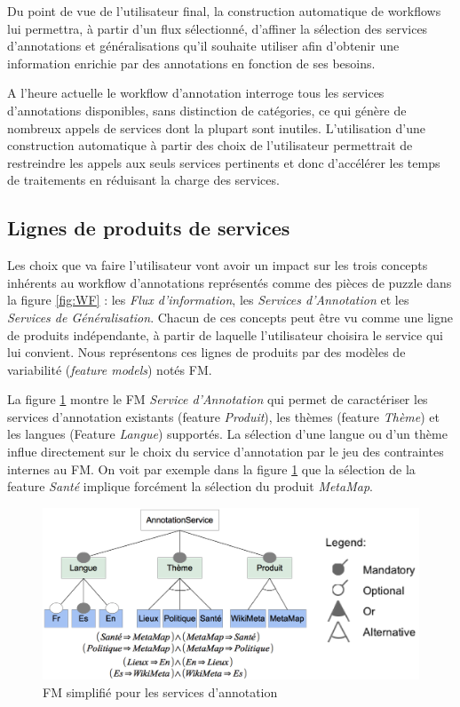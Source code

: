 \documentclass[]{easychair}
\begin{document}
Du point de vue de l'utilisateur final, la construction automatique de workflows lui permettra, à partir d'un flux sélectionné, d'affiner la sélection des services d'annotations et généralisations qu'il souhaite utiliser afin d'obtenir une information enrichie par des annotations en fonction de ses besoins. 

A l'heure actuelle le workflow d'annotation interroge tous les services d'annotations disponibles, sans distinction de catégories, ce qui génère de nombreux appels de services dont la plupart sont inutiles. L'utilisation d'une construction automatique à partir des choix de l'utilisateur permettrait de restreindre les appels aux seuls services pertinents et donc d'accélérer les temps de traitements en réduisant la charge des services. 


\subsection{Lignes de produits de services}
Les choix que va faire l'utilisateur vont avoir un impact sur les trois concepts inhérents au workflow d'annotations représentés comme des pièces de puzzle dans la figure \ref{fig:WF} : les \textit{Flux d'information}, les \textit{Services d'Annotation} et les \textit{Services de Généralisation}. Chacun de ces concepts peut être vu comme une ligne de produits indépendante, à partir de laquelle l'utilisateur choisira le service qui lui convient. Nous représentons ces lignes de produits par des modèles de variabilité (\textsl{feature models}) notés FM.

La figure \ref{fig:mmFM} montre le FM \textit{Service d'Annotation} qui permet de caractériser les services d'annotation existants (feature \textit{Produit}), les thèmes (feature \textit{Thème}) et les langues (Feature \textit{Langue}) supportés. La sélection d'une langue ou d'un thème influe directement sur le choix du service d'annotation par le jeu des contraintes internes au FM. On voit par exemple dans la figure \ref{fig:mmFM} que la sélection de la feature \textit{Santé} implique forcément la sélection du produit \textit{MetaMap}.

\begin{figure}[htb!]
	\begin{centering}
	\includegraphics[scale=0.4]{FM.png}
	\caption{FM simplifié pour les services d'annotation}
	\label{fig:mmFM}
	\end{centering}
\end{figure}
\end{document}
